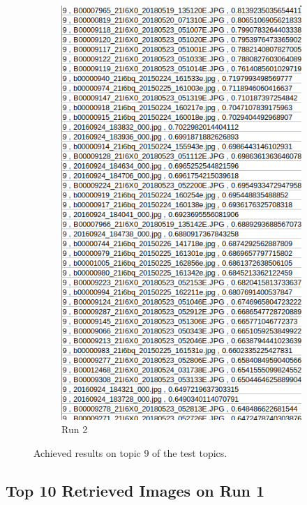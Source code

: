 \begin{figure}[H]
\begin{subfigure}{0.385\textwidth}
  \includegraphics[width=\textwidth]{Sections/7Results/images/topic9results2.png}
  \caption{Run 2}
  \end{subfigure}
  \caption{Achieved results on topic 9 of the test topics.}
  \label{fig:runs_csv}
\end{figure}

\newpage




\subsection{Top 10 Retrieved Images on Run 1}
\label{sec:run1}

